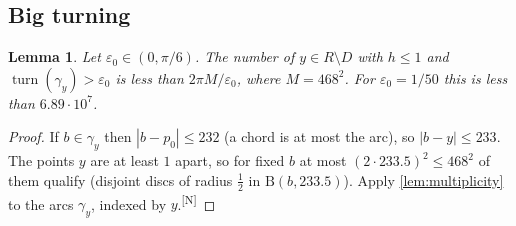 \documentclass[11pt]{amsart}
\newtheorem{lemma}[theorem]{Lemma}
\theoremstyle{definition}
\theoremstyle{remark}
\newcommand{\eps}{\varepsilon}
\newcommand{\turn}{\operatorname{turn}}
\newcommand{\Dd}{\mathrm{B}}      %
\newcommand{\chk}[1]{\textsuperscript{[#1]}}
\begin{document}
\subsection{Big turning}
\begin{lemma}\label{lem:BT}
Let $\eps_0\in(0,\pi/6)$. The number of $y\in R\setminus D$ with $h\le1$ and $\turn(\gamma_y)>\eps_0$ is less than $2\pi M/\eps_0$, where $M=468^2$. For $\eps_0=1/50$ this is less than $6.89\cdot10^7$.
\end{lemma}
\begin{proof}
If $b\in\gamma_y$ then $|b-p_0|\le232$ (a chord is at most the arc), so $|b-y|\le233$. The points $y$ are at least $1$ apart, so for fixed $b$ at most $(2\cdot233.5)^2\le468^2$ of them qualify (disjoint discs of radius $\frac12$ in $\Dd(b,233.5)$). Apply \cref{lem:multiplicity} to the arcs $\gamma_y$, indexed by $y$.\chk{N}
\end{proof}
\end{document}
